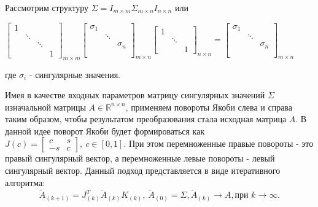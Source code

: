
Рассмотрим структуру $\Sigma = I_{m\times m}\Sigma_{m\times n}I_{n\times n}$ или

\begin{center}
    $\begin{bmatrix}
        1 & & & \\
         & \ddots & & \\
         & & \ddots & \\
         & & & 1
    \end{bmatrix}_{m \times m}
    \begin{bmatrix}
        \sigma_1 & & \\
         & \ddots & \\
         & & \sigma_n \\
         & & \\
         & & 
    \end{bmatrix}_{m \times n}
    \begin{bmatrix}
        1 & & \\
         & \ddots & \\
         & & 1
    \end{bmatrix}_{n \times n}
    =
    \begin{bmatrix}
        \sigma_1 & & \\
         & \ddots & \\
         & & \sigma_n \\
         & & \\
         & & 
    \end{bmatrix}_{m \times n}$
    
    \vspace{1em} 
    где $\sigma_i$ - сингулярные значения.
\end{center}

Имея в качестве входных параметров матрицу сингулярных значений $\Sigma$ изначальной матрицы $A\in \mathbb{R}^{n\times n}$, применяем повороты Якоби слева и справа таким образом, чтобы результатом преобразования стала исходная матрица $A$. В данной идее поворот Якоби будет формироваться как $J(c) = \begin{bmatrix}
    c&s\\-s&c
\end{bmatrix},\ c\in[0,1]$. При этом перемноженные правые повороты - это правый сингулярный вектор, а перемноженные левые повороты - левый сингулярный вектор. Данный подход представляется в виде итеративного алгоритма:
\begin{equation}
    \tilde{A}_{(k+1)}=J^T_{(k)}\tilde{A}_{(k)}K_{(k)},\ \tilde{A}_{(0)} = \Sigma, \tilde{A}_{(k)} \longrightarrow A, \text{при }k \to \infty.
\end{equation}

